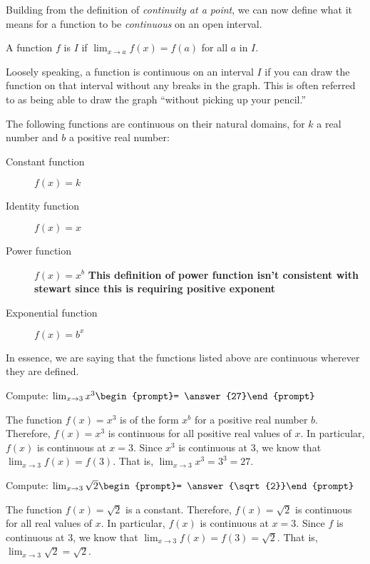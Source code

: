 \documentclass{ximera}
\begin{document}
Building from the definition of \textit{continuity at a point}, we can
now define what it means for a function to be \textit{continuous} on
an open interval.

\begin{definition}
  A function $f$ is  $I$ if
  $\lim_{x\to a} f(x) = f(a)$ for all $a$ in $I$.
\end{definition}

Loosely speaking, a function is continuous on an interval $I$ if you
can draw the function on that interval without any breaks in the
graph.  This is often referred to as being able to draw the graph
``without picking up your pencil.''

\begin{theorem}\label{theorem:continuity}
The following functions are continuous on their natural domains, for $k$ a real number and $b$ a positive real number:
\begin{description}
\item[Constant function] $f(x) =k$
\item[Identity function] $f(x) = x$ 
\item[Power function] $f(x)=x^b$ \textbf{This definition of power function isn't consistent with stewart since this is requiring positive exponent}
\item[Exponential function] $f(x)=b^x$ 
\end{description}
In essence, we are saying that the functions listed above are
continuous wherever they are defined.

\end{theorem}


\begin{question}
  Compute:
  $\lim_{x\to 3} x^3\begin{prompt}= \answer{27}\end{prompt}$
  \begin{feedback}
    The function $f(x)=x^3$ is of the form $x^b$ for a positive real number
    $b$.  Therefore, $f(x)=x^3$ is continuous for all positive real values of
    $x$.  In particular, $f(x)$ is continuous at $x=3$.  Since $x^3$
    is continuous at $3$, we know that $\lim_{x\to 3} f(x) = f(3)$.
    That is, $\lim_{x\to 3} x^3 = 3^3=27$.
  \end{feedback}  
\end{question}
\begin{question}
  Compute:
  $\lim_{x\to 3} \sqrt{2}\begin{prompt}= \answer{\sqrt{2}}\end{prompt}$
  \begin{feedback}
    The function $f(x)= \sqrt{2}$ is a constant.
  Therefore, $f(x)=\sqrt{2}$ is continuous for all real values of
    $x$.  In particular, $f(x)$ is continuous at $x=3$.  Since $f$
    is continuous at $3$, we know that $\lim_{x\to 3} f(x) = f(3)=\sqrt{2}$.
    That is, $\lim_{x\to 3} \sqrt{2}= \sqrt{2}$.
  \end{feedback}  
\end{question}
\end{document}
